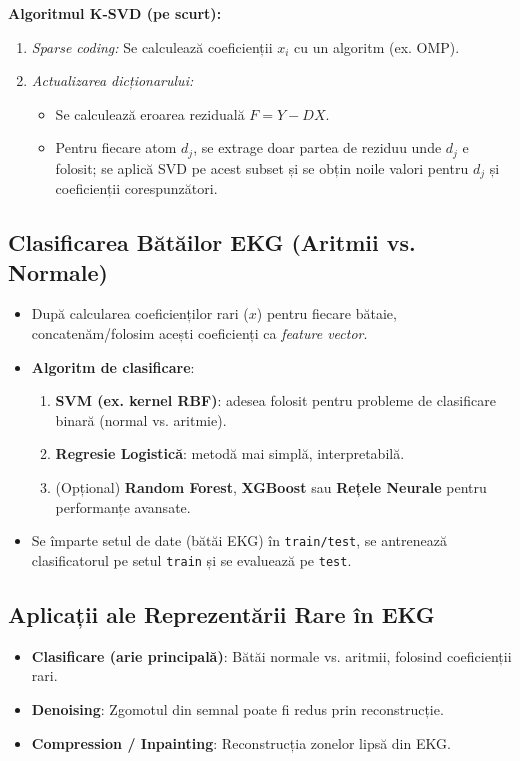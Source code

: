 \documentclass[12pt]{article}  %
\begin{document}
\textbf{Algoritmul K-SVD (pe scurt):}
\begin{enumerate}
    \item \emph{Sparse coding:} Se calculează coeficienții \( x_i \) cu un algoritm (ex. OMP).
    \item \emph{Actualizarea dicționarului:}  
    \begin{itemize}
        \item Se calculează eroarea reziduală \( F = Y - D X \).
        \item Pentru fiecare atom \( d_j \), se extrage doar partea de reziduu unde \( d_j \) e folosit; se aplică SVD pe acest subset și se obțin noile valori pentru \( d_j \) și coeficienții corespunzători.
    \end{itemize}
\end{enumerate}

\subsection{Clasificarea Bătăilor EKG (Aritmii vs. Normale)}

\begin{itemize}
    \item După calcularea coeficienților rari (\( x \)) pentru fiecare bătaie, concatenăm/folosim acești coeficienți ca \emph{feature vector}.
    \item \textbf{Algoritm de clasificare}:
    \begin{enumerate}
        \item \textbf{SVM (ex. kernel RBF)}: adesea folosit pentru probleme de clasificare binară (normal vs. aritmie).
        \item \textbf{Regresie Logistică}: metodă mai simplă, interpretabilă.
        \item (Opțional) \textbf{Random Forest}, \textbf{XGBoost} sau \textbf{Rețele Neurale} pentru performanțe avansate.
    \end{enumerate}
    \item Se împarte setul de date (bătăi EKG) în \texttt{train/test}, se antrenează clasificatorul pe setul \texttt{train} și se evaluează pe \texttt{test}.
\end{itemize}

\subsection{Aplicații ale Reprezentării Rare în EKG}
\begin{itemize}
    \item \textbf{Clasificare (arie principală)}: Bătăi normale vs. aritmii, folosind coeficienții rari.
    \item \textbf{Denoising}: Zgomotul din semnal poate fi redus prin reconstrucție.
    \item \textbf{Compression / Inpainting}: Reconstrucția zonelor lipsă din EKG.
\end{itemize}
\end{document}

